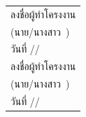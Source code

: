 \documentclass[20pt,a4paper]{article}
\newcommand{\firstStudentPrefixTH}{นาย/นางสาว}
\newcommand{\firstStudentNameTH}{\dotfill}
\newcommand{\secondStudentPrefixTH}{นาย/นางสาว}
\newcommand{\secondStudentNameTH}{\dotfill}
\begin{document}



\renewcommand{\refname}{บรรณานุกรม (References)}




\begin{flushright}

\begin{tabular}{>{\centering\arraybackslash}p{}}

\vspace{0.5em}

ลงชื่อผู้ทำโครงงาน \dotfill
\\
(\firstStudentPrefixTH\ \firstStudentNameTH)
\\
วันที่ \dotfill/\dotfill/\dotfill
\\[1em]

ลงชื่อผู้ทำโครงงาน \dotfill
\\
(\secondStudentPrefixTH\ \secondStudentNameTH)
\\
วันที่ \dotfill/\dotfill/\dotfill

\end{tabular}

\end{flushright}
\end{document}
